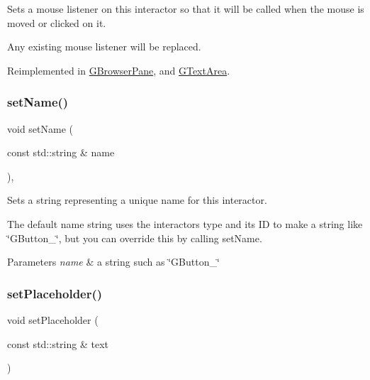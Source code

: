 Sets a mouse listener on this interactor so that it will be called when the mouse is moved or clicked on it. 

Any existing mouse listener will be replaced. 

Reimplemented in \mbox{\hyperlink{classGBrowserPane_a3ed42c5f929cba378927916dd73e6576}{G\+Browser\+Pane}}, and \mbox{\hyperlink{classGTextArea_a3ed42c5f929cba378927916dd73e6576}{G\+Text\+Area}}.

\mbox{\label{classGInteractor_a9d3a2685df23b5e7cbf59c19c4a1f9b5}} 
\subsubsection{\texorpdfstring{set\+Name()}{setName()}}
{\footnotesize\ttfamily void set\+Name (\begin{DoxyParamCaption}\item[{const std\+::string \&}]{name }\end{DoxyParamCaption})\hspace{0.3cm}{\ttfamily [virtual]}, {\ttfamily [inherited]}}



Sets a string representing a unique name for this interactor. 

The default name string uses the interactor\textquotesingle{}s type and its ID to make a string like \char`\"{}\+G\+Button\+\_\char`\"{}, but you can override this by calling set\+Name. 
\begin{DoxyParams}{Parameters}
{\em name} & a string such as \char`\"{}\+G\+Button\+\_\char`\"{} \\
\hline
\end{DoxyParams}
\mbox{\label{classGTextField_aa21a9bebb4652ab6780d0c11eff47aee}} 
\subsubsection{\texorpdfstring{set\+Placeholder()}{setPlaceholder()}}
{\footnotesize\ttfamily void set\+Placeholder (\begin{DoxyParamCaption}\item[{const std\+::string \&}]{text }\end{DoxyParamCaption})\hspace{0.3cm}{\ttfamily [virtual]}}



